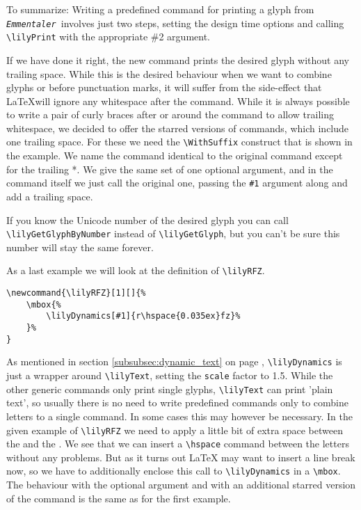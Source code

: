 \documentclass{article}
\newcommand*{\emmentaler}{\texttt{\textit{Emmentaler }}}
\newcommand*{\cmd}[1]{\texttt{\textbackslash #1}}
\begin{document}
To summarize: Writing a predefined command for printing a glyph from \emmentaler involves just two steps, setting the design time options and calling \cmd{lilyPrint} with the appropriate \#2 argument.

\medskip
If we have done it right, the new command prints the desired glyph without any trailing space. 
While this is the desired behaviour when we want to combine glyphs or before punctuation marks, it will suffer from the side-effect that \LaTeX will ignore any whitespace after the command.
While it is always possible to write a pair of curly braces after or around the command to allow trailing whitespace, we decided to offer the starred versions of commands, which include one trailing space.
For these we need the \cmd{WithSuffix} construct that is shown in the example.
We name the command identical to the original command except for the trailing *.
We give the same set of one optional argument, and in the command itself we just call the original one, passing the \texttt{\#1} argument along and add a trailing space.

\medskip
If you know the Unicode number of the desired glyph you can call \cmd{lilyGetGlyphByNumber} instead of \cmd{lilyGetGlyph}, but you can't be sure this number will stay the same forever.

\medskip
As a last example we will look at the definition of \lilyRFZ \cmd{lilyRFZ}.

\begin{verbatim}
\newcommand{\lilyRFZ}[1][]{%
	\mbox{%
		\lilyDynamics[#1]{r\hspace{0.035ex}fz}%
	}%
}
\end{verbatim}
As mentioned in section \ref{subsubsec:dynamic_text} on page \pageref{subsubsec:dynamic_text}, \cmd{lilyDynamics} is just a wrapper around \cmd{lilyText}, setting the \texttt{scale} factor to 1.5.
While the other generic commands only print single glyphs, \cmd{lilyText} can print 'plain text', so usually there is no need to write predefined commands only to combine letters to a single command.
In some cases this may however be necessary.
In the given example of \cmd{lilyRFZ} we need to apply a little bit of extra space between the  and the .
We see that we can insert a \cmd{hspace} command between the letters without any problems.
But as it turns out \LaTeX{} may want to insert a line break now, so we have to additionally enclose this call to \cmd{lilyDynamics} in a \cmd{mbox}.
The behaviour with the optional argument and with an additional starred version of the command is the same as for the first example.
\end{document}
